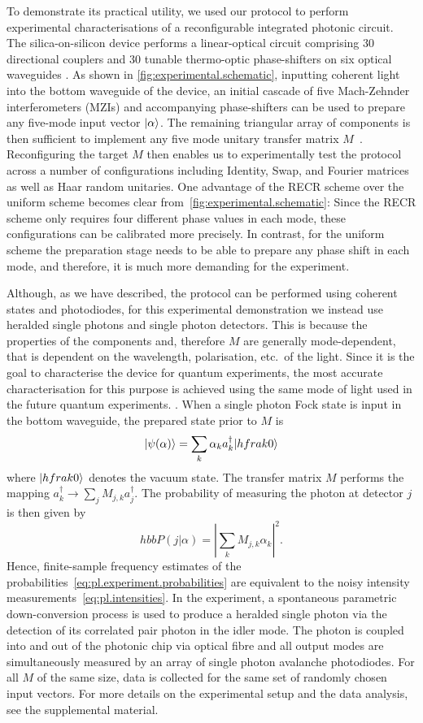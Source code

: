 To demonstrate its practical utility, we used our protocol to perform experimental characterisations of a reconfigurable integrated photonic circuit.
The silica-on-silicon device performs a linear-optical circuit comprising 30 directional couplers and 30 tunable thermo-optic phase-shifters on six optical waveguides \cite{Carolan_2015_Universal}.
As shown in \cref{fig:experimental.schematic}, inputting coherent light into the bottom waveguide of the device, an initial cascade of five Mach-Zehnder interferometers (MZIs) and accompanying phase-shifters can be used to prepare any five-mode input vector $\ket{{\alpha}}$.
The remaining triangular array of components is then sufficient to implement any five mode unitary transfer matrix $M$~\cite{Reck_1994_Experimental}.
Reconfiguring the target $M$ then enables us to experimentally test the protocol across a number of configurations including Identity, Swap, and Fourier matrices as well as Haar random unitaries.
One advantage of the RECR scheme over the uniform scheme becomes clear from~\cref{fig:experimental.schematic}:
Since the RECR scheme only requires four different phase values in each mode, these configurations can be calibrated more precisely.
In contrast, for the uniform scheme the preparation stage needs to be able to prepare any phase shift in each mode, and therefore, it is much more demanding for the experiment.

Although, as we have described, the protocol can be performed using coherent states and photodiodes, for this experimental demonstration we instead use heralded single photons and single photon detectors.
This is because the properties of the components and, therefore $ M$ are generally mode-dependent, that is dependent on the wavelength, polarisation, etc.\ of the light.
Since it is the goal to characterise the device for quantum experiments, the most accurate characterisation for this purpose is achieved using the same mode of light used in the future quantum experiments. .
When a single photon Fock state is input in the bottom waveguide, the prepared state prior to $ M$ is
\[
  \ket{\psi({\alpha})} = \sum_k \alpha_k a_k^{\dag} \ket{hfrak{0}}
\]
where $\ket{hfrak{0}}$ denotes the vacuum state.
The transfer matrix $M$ performs the mapping $a_k^{\dag} \rightarrow \sum_j M_{j,k}a_j^{\dag}$.
The probability of measuring the photon at detector $j$ is then given by
\[
  hbb{P}(j|{\alpha}) = \left| \sum_k M_{j,k} \alpha_k \right|^2.
  \label{eq:pl.experiment.probabilities}
\]
Hence, finite-sample frequency estimates of the probabilities~\eqref{eq:pl.experiment.probabilities} are equivalent to the noisy intensity measurements~\eqref{eq:pl.intensities}.
In the experiment, a spontaneous parametric down-conversion process is used to produce a heralded single photon via the detection of its correlated pair photon in the idler mode.
The photon is coupled into and out of the photonic chip via optical fibre and all output modes are simultaneously measured by an array of single photon avalanche photodiodes.
For all $ M$ of the same size, data is collected for the same set of randomly chosen input vectors.
For more details on the experimental setup and the data analysis, see the supplemental material.\\



